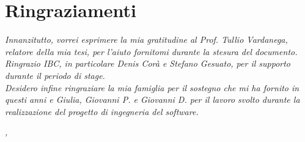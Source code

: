 
\cleardoublepage
{}
{}

%
%

\begingroup
\let\clearpage\relax
\let\cleardoublepage\relax
\let\cleardoublepage\relax

\chapter*{Ringraziamenti}

\noindent \textit{Innanzitutto, vorrei esprimere la mia gratitudine al Prof. Tullio Vardanega, relatore della mia tesi, per l'aiuto fornitomi durante la stesura del documento.}\\

\noindent \textit{Ringrazio IBC, in particolare Denis Corà e Stefano Gesuato, per il supporto durante il periodo di stage.}\\

\noindent \textit{Desidero infine ringraziare la mia famiglia per il sostegno che mi ha fornito in questi anni e Giulia, Giovanni P. e Giovanni D. per il lavoro svolto durante la realizzazione del progetto di ingegneria del software.}\\
\bigskip

\noindent\textit{\myLocation, \myTime}
\hfill \myName

\endgroup

